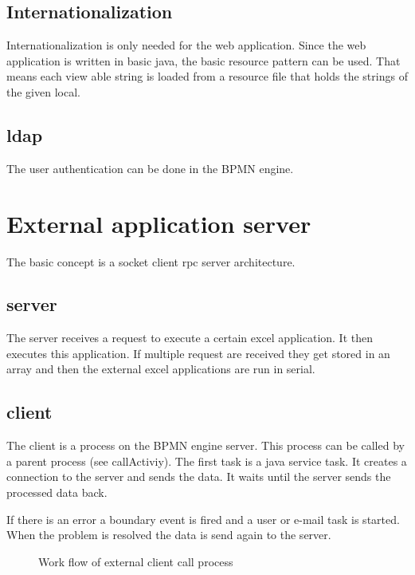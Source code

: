 \documentclass[paper=a4,twoside=false,BCOR=0mm,DIV=calc,fontsize=12pt]{scrartcl}
\begin{document}
\subsection{Internationalization}
Internationalization is only needed for the web application. Since the web application is written in basic java, the basic resource pattern can be used. That means each view able string is loaded from a resource file that holds the strings of the given local. 



\subsection{ldap}
The user authentication can be done in the BPMN engine.


\section{External application server}
The basic concept is a socket client rpc server architecture. \cite{rpc}

\subsection{server}

The server receives a request to execute a certain excel application. It then executes this application. If multiple request are received they get stored in an array and then the external excel applications are run in serial.





\subsection{client}
The client is a process on the BPMN engine server. This process can be called by a parent process (see callActiviy). 
The first task is a java service task. It creates a connection to the server and sends the data. 
It waits until the server sends the processed data back.

If there is an error a boundary event is fired and a user or e-mail task is started. When the problem is resolved the 
data is send again to the server.


\begin{figure}
    \begin{center}
    \end{center}
  \caption{Work flow of external client call process}
  \label{externClientWorkflow}
\end{figure} 
\end{document}

